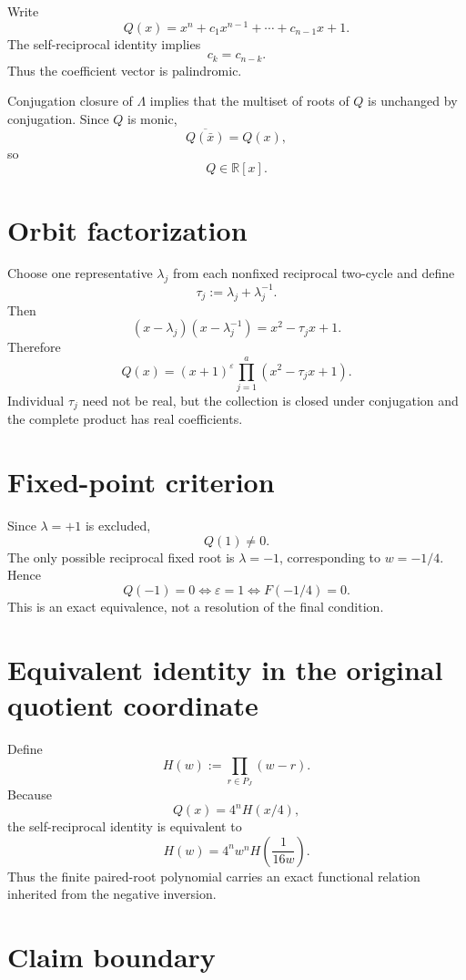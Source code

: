 Write
\[
 Q(x)=x^n+c_1x^{n-1}+\cdots+c_{n-1}x+1.
\]
The self-reciprocal identity implies
\[
 \boxed{c_k=c_{n-k}}.
\]
Thus the coefficient vector is palindromic.

Conjugation closure of $\Lambda$ implies that the multiset of roots of $Q$ is unchanged by conjugation. Since $Q$ is monic,
\[
 \overline{Q(\bar x)}=Q(x),
\]
so
\[
 \boxed{Q\in\mathbb R[x]}.
\]

\section{Orbit factorization}

Choose one representative $\lambda_j$ from each nonfixed reciprocal two-cycle and define
\[
 \tau_j:=\lambda_j+\lambda_j^{-1}.
\]
Then
\[
 (x-\lambda_j)(x-\lambda_j^{-1})
 =x^2-\tau_jx+1.
\]
Therefore
\[
 \boxed{
 Q(x)
 =(x+1)^\varepsilon
 \prod_{j=1}^{a}\left(x^2-\tau_jx+1\right).
 }
\]
Individual $\tau_j$ need not be real, but the collection is closed under conjugation and the complete product has real coefficients.

\section{Fixed-point criterion}

Since $\lambda=+1$ is excluded,
\[
 \boxed{Q(1)\neq0}.
\]
The only possible reciprocal fixed root is $\lambda=-1$, corresponding to $w=-1/4$. Hence
\[
 \boxed{
 Q(-1)=0
 \iff
 \varepsilon=1
 \iff
 F(-1/4)=0.
 }
\]
This is an exact equivalence, not a resolution of the final condition.

\section{Equivalent identity in the original quotient coordinate}

Define
\[
 H(w):=\prod_{r\in P_J}(w-r).
\]
Because
\[
 Q(x)=4^nH(x/4),
\]
the self-reciprocal identity is equivalent to
\[
 \boxed{
 H(w)=4^n w^nH\!\left(\frac1{16w}\right).
 }
\]
Thus the finite paired-root polynomial carries an exact functional relation inherited from the negative inversion.

\section{Claim boundary}

